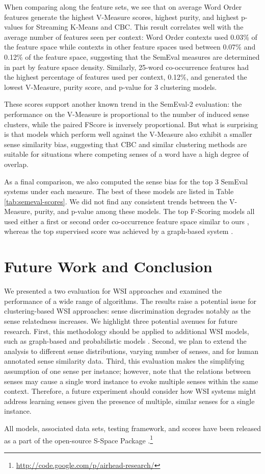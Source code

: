 \documentclass[11pt]{article}
\begin{document}
When comparing along the feature sets, we see that on average Word Order
features generate the highest V-Measure scores, highest purity, and highest
p-values for Streaming K-Means and CBC.  This result correlates well with the
average number of features seen per context: Word Order contexts used 0.03\% of
the feature space while contexts in other feature spaces used between 0.07\% and
0.12\% of the feature space, suggesting that the SemEval measures are determined
in part by feature space density.  Similarly, 25-word co-occurrence features had
the highest percentage of features used per context, 0.12\%, and generated the
lowest V-Measure, purity score, and p-value for 3 clustering models.


These scores support another known trend in the SemEval-2 evaluation: the
performance on the V-Measure is proportional to the number of induced sense
clusters, while the paired FScore is inversely proportional.  But what is
surprising is that models which perform well against the V-Measure also exhibit
a smaller sense similarity bias, suggesting that CBC and similar clustering
methods are suitable for situations where competing senses of a word have a high
degree of overlap.


As a final comparison, we also computed the sense bias for the top 3 SemEval
systems under each measure.  The best of these models are listed in Table
\ref{tab:semeval-scores}.  We did not find any consistent trends between the
V-Measure, purity, and p-value among these models.  The top F-Scoring models all
used either a first or second order co-occurrence feature space similar to ours
\cite{kern10kcdc,pedersen10duluth}, whereas the top supervised score was
achieved by a graph-based system \cite{klapaftis08word}.

\section{Future Work and Conclusion}

We presented a two evaluation for WSI approaches and examined the performance of
a wide range of algorithms.  The results raise a potential issue for
clustering-based WSI approaches: sense discrimination degrades notably as the
sense relatedness increases.  We highlight three potential avenues for future
research.  First, this methodology should be applied to additional WSI models,
such as graph-based \cite{klapaftis08word,navigli10inducing} and probabilistic
models \cite{dinu10measuring,elshamy10ksu}.
%
Second, we plan to extend the analysis to different sense distributions, varying
number of senses, and for human annotated sense similarity data.  
%
Third, this evaluation makes the simplifying assumption of one sense per
instance; however,  note that the relations between
senses may cause a single word instance to evoke multiple senses within the same
context.  Therefore, a future experiment should consider how WSI systems might
address learning senses given the presence of multiple, similar senses for a
single instance.

All models, associated data sets, testing framework, and scores have been
released as a part of the open-source S-Space Package
\cite{jurgens10sspace}.\footnote{ \tiny\url{http://code.google.com/p/airhead-research/}}



\end{document}

